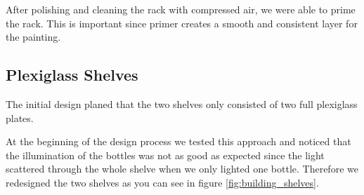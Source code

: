 \documentclass{acm_proc_article-sp}
\begin{document}
After polishing and cleaning the rack with compressed air, we were able to prime the rack. This is important since primer creates a smooth and consistent layer for the painting.


\subsection{Plexiglass Shelves}
The initial design planed that the two shelves only consisted of two full plexiglass plates.

\begin{minipage}{\linewidth}%
\label{fig:building_shelves}%
\end{minipage}

At the beginning of the design process we tested this approach and noticed that the illumination of the bottles was not as good as expected since the light scattered through the whole shelve when we only lighted one bottle. Therefore we redesigned the two shelves as you can see in figure \ref{fig:building_shelves}. 
\end{document}

